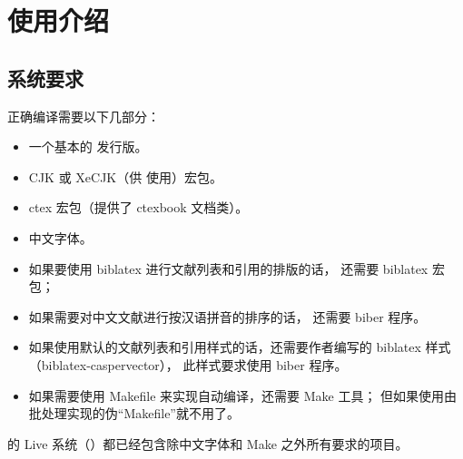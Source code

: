 %
%
%
%

\chapter{使用介绍}
\section{系统要求}\label{sec:req}

正确编译需要以下几部分：
\begin{itemize}
	\item 一个基本的  发行版。
	\item CJK 或 XeCJK（供  使用）宏包。
	\item ctex\supercite{ctex,ctex-faq} 宏包（提供了 ctexbook 文档类）。
	\item 中文字体。
	\item 如果要使用 biblatex 进行文献列表和引用的排版的话，
		还需要 biblatex\supercite{biblatex} 宏包；
	\item 如果需要对中文文献进行按汉语拼音的排序的话，
		还需要 biber\supercite{biber} 程序。
	\item 如果使用默认的文献列表和引用样式的话，还需要作者编写的 biblatex 样式
		（biblatex-caspervector\supercite{biblatex-caspervector}），
		此样式要求使用 biber 程序。
	\item 如果需要使用 Makefile 来实现自动编译，还需要 Make 工具；
		但如果使用由批处理实现的伪“Makefile”就不用了。
\end{itemize}

的  Live 系统（）都已经包含除中文字体和 Make 之外所有要求的项目。%


